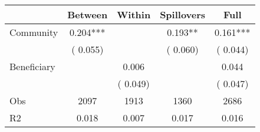 
\begin{tabular}{l*{4}{c}}\hline&\multicolumn{1}{c}{Between}&\multicolumn{1}{c}{Within}&\multicolumn{1}{c}{Spillovers}&\multicolumn{1}{c}{Full}\\ \hline
 Community             &              0.204***      &                                               &        0.193** &         0.161***                            \\ 
                               &        (       0.055)           &                                       &       (       0.060)     &      (       0.044)                                           \\ 
 Beneficiary   &                                               &        0.006    &                                &             0.044                            \\ 
                               &                                               & (       0.049)                  &                                        &      (       0.047)                                           \\ 
\hline                                                                                                                                                                                                                                            
 Obs                   &               2097               &       1913                       &       1360                &              2686                                               \\ 
 R2                    &                      0.018              &              0.007                      &              0.017               &                     0.016                                              \\ 
\hline \end{tabular}                                                                                                                                                                                                              